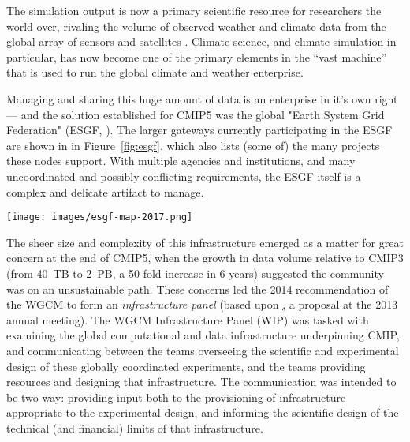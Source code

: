 \documentclass[gmd,manuscript]{copernicus}
\newcommand{\pipref}[1] {\citep{ref:#1}}
\newcommand{\figref}[1] {\mbox{Figure   \ref{fig:#1}}}
\begin{document}
The simulation output is now a primary scientific resource for
researchers the world over, rivaling the volume of 
observed weather and climate data from the global array of
sensors and satellites \pipref{overpecketal2011}. Climate science,
and climate simulation in particular, has now become one of the
primary elements in the ``vast machine'' \pipref{edwards2010}
that is used to run the global climate and weather enterprise. 

Managing and sharing this huge amount of data is an enterprise
in it's own right --- and the solution established for CMIP5
was the global "Earth System Grid Federation" (ESGF, \pipref{williamsetal2015}).
The larger gateways currently participating in the ESGF are shown in 
in \figref{esgf}, which also lists (some of) the many projects these
nodes support. With multiple agencies and institutions, and many uncoordinated and possibly conflicting
requirements, the ESGF itself is a complex and delicate artifact to manage.

\begin{figure*}
  \begin{center}
    \texttt{[image: images/esgf-map-2017.png]}
  \end{center}
  \caption{Sites participating in the Earth System Grid Federation in
    2017. Figure courtesy Dean Williams, adapted from the ESGF Brochure.
 }
  \label{fig:esgf}
\end{figure*}

The sheer size and complexity of this infrastructure emerged as a
matter for great concern at the end of CMIP5, when the growth in data
volume relative to CMIP3 (from 40~TB to 2~PB, a 50-fold increase in 6
years) suggested the community was on an unsustainable path. These
concerns led the 2014 recommendation of the WGCM to form an
\emph{infrastructure panel} (based upon \href{https://goo.gl/FHqbNN}, a
  proposal at the 2013 annual meeting). The WGCM Infrastructure Panel
(WIP) was tasked with examining the global computational and data
infrastructure underpinning CMIP, and communicating between the teams
overseeing the scientific and experimental design of these globally
coordinated experiments, and the teams providing resources and
designing that infrastructure. The communication was intended to be
two-way: providing input both to the provisioning of infrastructure
appropriate to the experimental design, and informing the scientific
design of the technical (and financial) limits of that infrastructure.
\end{document}
